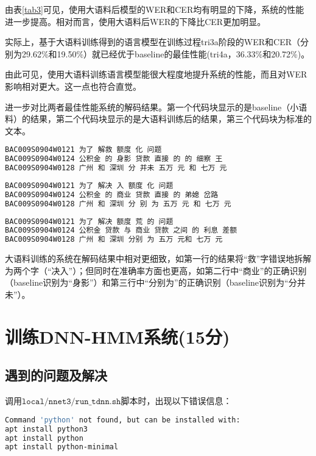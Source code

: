 \documentclass[a4paper]{article}
\renewcommand{\tt}[1]{\mathtt{#1}}
\begin{document}
\vspace{-1em}
由表\ref{tab3}可见，使用大语料后模型的WER和CER均有明显的下降，系统的性能进一步提高。相对而言，使用大语料后WER的下降比CER更加明显。

实际上，基于大语料训练得到的语言模型在训练过程tri3a阶段的WER和CER（分别为29.62\%和19.50\%）就已经优于baseline的最佳性能(tri4a，36.33\%和20.72\%)。

由此可见，使用大语料训练语言模型能很大程度地提升系统的性能，而且对WER影响相对更大。这一点也符合直觉。

\vspace{1em}
进一步对比两者最佳性能系统的解码结果。第一个代码块显示的是baseline（小语料）的结果，第二个代码块显示的是大语料训练后的结果，第三个代码块为标准的文本。

\begin{lstlisting}[language=bash]
BAC009S0904W0121 为了 解救 额度 化 问题 
BAC009S0904W0124 公积金 的 身影 贷款 直接 的 的 细察 王 
BAC009S0904W0128 广州 和 深圳 分 并未 五万 元 和 七万 元
\end{lstlisting}
\begin{lstlisting}[language=bash]
BAC009S0904W0121 为了 解决 入 额度 化 问题 
BAC009S0904W0124 公积金 的 商业 贷款 直接 的 弟媳 岔路 
BAC009S0904W0128 广州 和 深圳 分 别 为 五万 元 和 七万 元 \end{lstlisting}
\begin{lstlisting}[language=bash]
BAC009S0904W0121 为了 解决 额度 荒 的 问题 
BAC009S0904W0124 公积金 贷款 与 商业 贷款 之间 的 利息 差额 
BAC009S0904W0128 广州 和 深圳 分别 为 五万 元和 七万 元 \end{lstlisting}

大语料训练的系统在解码结果中相对更细致，如第一行的结果将“救”字错误地拆解为两个字（“决入”）；但同时在准确率方面也更高，如第二行中“商业”的正确识别（baseline识别为“身影”）和第三行中“分别为”的正确识别（baseline识别为“分并未”）。


\section{训练DNN-HMM系统(15分)}

\setcounter{subsection}{-1}
\subsection{遇到的问题及解决}
调用$\tt{local/nnet3/run\_tdnn.sh}$脚本时，出现以下错误信息：

\begin{lstlisting}[language=bash]
Command 'python' not found, but can be installed with:
apt install python3
apt install python
apt install python-minimal
\end{lstlisting}
\end{document}
